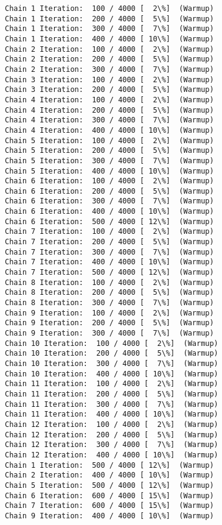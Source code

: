 \documentclass[11pt]{article}
\begin{document}
    \begin{Verbatim}[commandchars=\\\{\}]
Chain 1 Iteration:  100 / 4000 [  2\%]  (Warmup)
Chain 1 Iteration:  200 / 4000 [  5\%]  (Warmup)
Chain 1 Iteration:  300 / 4000 [  7\%]  (Warmup)
Chain 1 Iteration:  400 / 4000 [ 10\%]  (Warmup)
Chain 2 Iteration:  100 / 4000 [  2\%]  (Warmup)
Chain 2 Iteration:  200 / 4000 [  5\%]  (Warmup)
Chain 2 Iteration:  300 / 4000 [  7\%]  (Warmup)
Chain 3 Iteration:  100 / 4000 [  2\%]  (Warmup)
Chain 3 Iteration:  200 / 4000 [  5\%]  (Warmup)
Chain 4 Iteration:  100 / 4000 [  2\%]  (Warmup)
Chain 4 Iteration:  200 / 4000 [  5\%]  (Warmup)
Chain 4 Iteration:  300 / 4000 [  7\%]  (Warmup)
Chain 4 Iteration:  400 / 4000 [ 10\%]  (Warmup)
Chain 5 Iteration:  100 / 4000 [  2\%]  (Warmup)
Chain 5 Iteration:  200 / 4000 [  5\%]  (Warmup)
Chain 5 Iteration:  300 / 4000 [  7\%]  (Warmup)
Chain 5 Iteration:  400 / 4000 [ 10\%]  (Warmup)
Chain 6 Iteration:  100 / 4000 [  2\%]  (Warmup)
Chain 6 Iteration:  200 / 4000 [  5\%]  (Warmup)
Chain 6 Iteration:  300 / 4000 [  7\%]  (Warmup)
Chain 6 Iteration:  400 / 4000 [ 10\%]  (Warmup)
Chain 6 Iteration:  500 / 4000 [ 12\%]  (Warmup)
Chain 7 Iteration:  100 / 4000 [  2\%]  (Warmup)
Chain 7 Iteration:  200 / 4000 [  5\%]  (Warmup)
Chain 7 Iteration:  300 / 4000 [  7\%]  (Warmup)
Chain 7 Iteration:  400 / 4000 [ 10\%]  (Warmup)
Chain 7 Iteration:  500 / 4000 [ 12\%]  (Warmup)
Chain 8 Iteration:  100 / 4000 [  2\%]  (Warmup)
Chain 8 Iteration:  200 / 4000 [  5\%]  (Warmup)
Chain 8 Iteration:  300 / 4000 [  7\%]  (Warmup)
Chain 9 Iteration:  100 / 4000 [  2\%]  (Warmup)
Chain 9 Iteration:  200 / 4000 [  5\%]  (Warmup)
Chain 9 Iteration:  300 / 4000 [  7\%]  (Warmup)
Chain 10 Iteration:  100 / 4000 [  2\%]  (Warmup)
Chain 10 Iteration:  200 / 4000 [  5\%]  (Warmup)
Chain 10 Iteration:  300 / 4000 [  7\%]  (Warmup)
Chain 10 Iteration:  400 / 4000 [ 10\%]  (Warmup)
Chain 11 Iteration:  100 / 4000 [  2\%]  (Warmup)
Chain 11 Iteration:  200 / 4000 [  5\%]  (Warmup)
Chain 11 Iteration:  300 / 4000 [  7\%]  (Warmup)
Chain 11 Iteration:  400 / 4000 [ 10\%]  (Warmup)
Chain 12 Iteration:  100 / 4000 [  2\%]  (Warmup)
Chain 12 Iteration:  200 / 4000 [  5\%]  (Warmup)
Chain 12 Iteration:  300 / 4000 [  7\%]  (Warmup)
Chain 12 Iteration:  400 / 4000 [ 10\%]  (Warmup)
Chain 1 Iteration:  500 / 4000 [ 12\%]  (Warmup)
Chain 2 Iteration:  400 / 4000 [ 10\%]  (Warmup)
Chain 5 Iteration:  500 / 4000 [ 12\%]  (Warmup)
Chain 6 Iteration:  600 / 4000 [ 15\%]  (Warmup)
Chain 7 Iteration:  600 / 4000 [ 15\%]  (Warmup)
Chain 9 Iteration:  400 / 4000 [ 10\%]  (Warmup)

\end{Verbatim}
\end{document}
